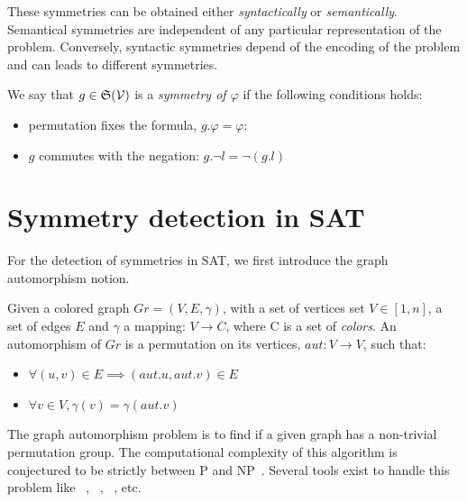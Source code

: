These symmetries can be obtained either \textit{syntactically} or \textit{semantically}.
Semantical symmetries are independent of any particular representation of the problem. Conversely,
syntactic symmetries depend of the encoding of the problem and can leads to different symmetries.

 We say that $g\in \mathfrak{S}(\mathcal{V})$ is a \textit{symmetry of $ \varphi$} if the following conditions holds:
\begin{itemize}[topsep=0em]
	\item permutation fixes the formula, $g.\varphi =  \varphi$: 
	\item $g$  commutes with the negation: $g.\neg l  = \neg (g.l)$
\end{itemize}


\section{Symmetry detection in SAT}
For the detection of symmetries in SAT, we first introduce the graph automorphism notion.

Given a colored graph $Gr = (V, E, \gamma)$, with a set of vertices set $V \in  [1, n] $, a set of edges $E$ and
$\gamma$ a mapping: $V \rightarrow C$, where C is a set of \emph{colors}.
An automorphism of $Gr$ is a permutation on its vertices, $aut :V \rightarrow V$,
such that:
\begin{itemize}
 \item $\forall (u, v) \in E \implies (aut.u, aut.v) \in E$
 \item $\forall v \in V, \gamma(v) = \gamma(aut.v)$
\end{itemize}
The graph automorphism problem is to find if a given graph has a non-trivial permutation group. 
The computational complexity of this algorithm is conjectured to be strictly between P and NP~\cite{kobler2012graph,toran2004hardness}.
Several tools exist to handle this problem like \saucy~\cite{katebi2010symmetry},
\bliss~\cite{JunttilaKaski:ALENEX2007}, \nauty~\cite{mckay2003nauty}, etc.

%

